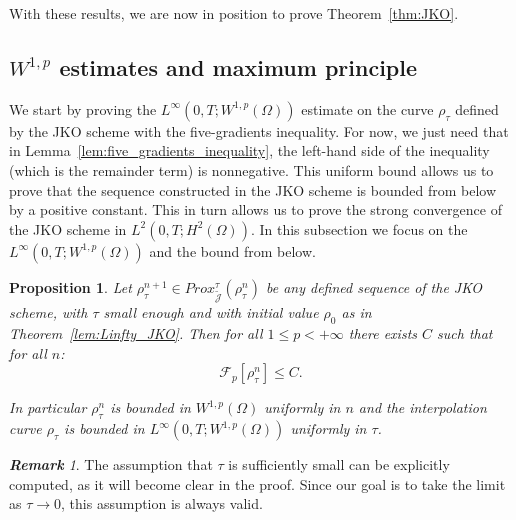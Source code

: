 \documentclass[a4paper,twosided, 11pt]{article}
\renewcommand{\color}[2][]{}
\theoremstyle{plain}
\newtheorem{proposition}[thm]{Proposition}
\theoremstyle{remark}
\newtheorem{remark}[thm]{\bf Remark}
\numberwithin{equation}{section}
\begin{document}
With these results, we are now in position to prove Theorem~\ref{thm:JKO}. 

\subsection{$W^{1,p}$ estimates and maximum principle}

We start by proving the $L^{\infty}(0,T; W^{1,p}(\Omega))$ estimate on the curve $\rho_{\tau}$ defined by the JKO scheme with the five-gradients inequality. For now, we just need that in Lemma~\ref{lem:five_gradients_inequality}, the left-hand side of the inequality (which is the remainder term) is nonnegative. This uniform bound allows us to prove that the sequence constructed in the JKO scheme is bounded from below by a positive constant. This in turn allows us to prove the strong convergence of the JKO scheme in $L^2(0,T; H^2(\Omega))$. In this subsection we focus on the $L^{\infty}(0,T; W^{1,p}(\Omega))$ and the bound from below. 

\begin{proposition}\label{prop:JKO_FP}
Let $\rho^{n+1}_{\tau}\in Prox_{\widetilde{\mathcal{J}}}^{\tau}(\rho^{n}_{\tau})$ be {\color{blue} any defined sequence of the JKO scheme, with $\tau$ small enough and with initial value $\rho_{0}$ as in Theorem~\ref{lem:Linfty_JKO}}. Then for all $1\le p<+\infty$ there exists $C$ such that for all $n$: 
$$
\mathcal{F}_{p}[\rho^{n}_{\tau}]\le C .
$$

In particular $\rho^{n}_{\tau}$ is bounded in $W^{1,p}(\Omega)$ uniformly in $n$ and the interpolation curve $\rho_{\tau}$ is bounded in $L^{\infty}(0,T; W^{1,p}(\Omega))$ uniformly in $\tau$. 

\end{proposition}

\begin{remark}
The assumption that $\tau$ is sufficiently small can be explicitly computed, as it will become clear in the proof. Since our goal is to take the limit as $\tau \to 0$, this assumption is always valid. 
\end{remark}
\end{document}
